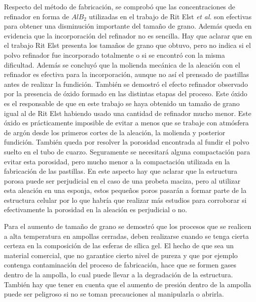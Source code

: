 \documentclass[a4paper,12pt,fleqn,twoside,openany]{book}
\begin{document}
Respecto del método de fabricación, se comprobó que las concentraciones de refinador en forma de $AlB_2$ utilizadas en el trabajo de Rit Elst \textit{et al.} \cite{ritelst} son efectivas para obtener una disminución importante del tamaño de grano. Además queda en evidencia que la incorporación del refinador no es sencilla. Hay que aclarar que en el trabajo Rit Elst presenta los tamaños de grano que obtuvo, pero no indica si el polvo refinador fue incorporado totalmente o si se encontró con la misma dificultad. Además se concluyó que la molienda mecánica de la aleación con el refinador es efectiva para la incorporación, aunque no así el prensado de pastillas antes de realizar la fundición. También se demostró el efecto refinador observado por la presencia de óxido formado en las distintas etapas del proceso. Este óxido es el responsable de que en este trabajo se haya obtenido un tamaño de grano igual al de Rit Elst habiendo usado una cantidad de refinador mucho menor. Este óxido es prácticamente imposible de evitar a menos que se trabaje con atmósfera de argón desde los primeros cortes de la aleación, la molienda y posterior fundición. También queda por resolver la porosidad encontrada al fundir el polvo suelto en el tubo de cuarzo. Seguramente se necesitará alguna compactación para evitar esta porosidad, pero mucho menor a la compactación utilizada en la fabricación de las pastillas. En este aspecto hay que aclarar que la estructura porosa puede ser perjudicial en el caso de una probeta maciza, pero al utilizar esta aleación en una esponja, estos pequeños poros pasarán a formar parte de la estructura celular por lo que habría que realizar más estudios para corroborar si efectivamente la porosidad en la aleación es perjudicial o no.

Para el aumento de tamaño de grano se demostró que los procesos que se realicen a alta temperatura en ampollas cerradas, deben realizarse cuando se tenga cierta certeza en la composición de las esferas de sílica gel. El hecho de que sea un material comercial, que no garantice cierto nivel de pureza y que por ejemplo contenga contaminación del proceso de fabricación, hace que se formen gases dentro de la ampolla, lo cual puede llevar a la degradación de la estructura. También hay que tener en cuenta que el aumento de presión dentro de la ampolla puede ser peligroso si no se toman precauciones al manipularla o abrirla.  
\end{document}
